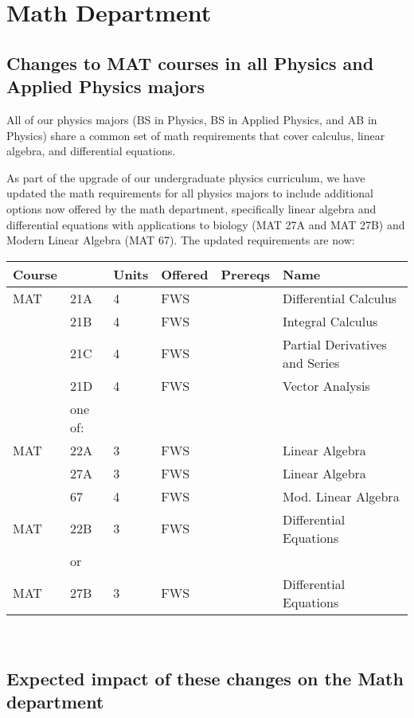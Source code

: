 \documentclass[12pt]{article}
\begin{document}
\section{Math Department}

\subsection{Changes to MAT courses in all Physics and Applied Physics majors}

All of our physics majors (BS in Physics, BS in Applied Physics, and
AB in Physics) share a common set of math requirements that cover
calculus, linear algebra, and differential equations.

As part of the upgrade of our undergraduate physics curriculum, we
have updated the math requirements for all physics majors to include
additional options now offered by the math department, specifically
linear algebra and differential equations with applications to biology
(MAT 27A and MAT 27B) and Modern Linear Algebra (MAT 67).  The updated
requirements are now:
\vskip 0.25cm
\noindent
\begin{tabular}{|llllll|}
\hline
Course & & Units & Offered & Prereqs & Name \\
\hline
MAT & 21A & 4 & FWS & & Differential Calculus\\ 
    & 21B & 4 & FWS &  & Integral Calculus \\ 
    & 21C & 4 & FWS &  & Partial Derivatives and Series\\ 
    & 21D & 4 & FWS &  & Vector Analysis\\
\hline
    & one of:  & & & & \\
MAT & 22A & 3 & FWS &  & Linear Algebra\\
    & 27A & 3 & FWS &  & Linear Algebra\\
    & 67  & 4 & FWS &  & Mod. Linear Algebra\\
\hline
MAT & 22B & 3 & FWS &  & Differential Equations\\
    & or  & & & & \\
MAT & 27B & 3 & FWS &  & Differential Equations\\ 
\hline
\end{tabular}\\

\subsection{Expected impact of these changes on the Math department}
\end{document}
